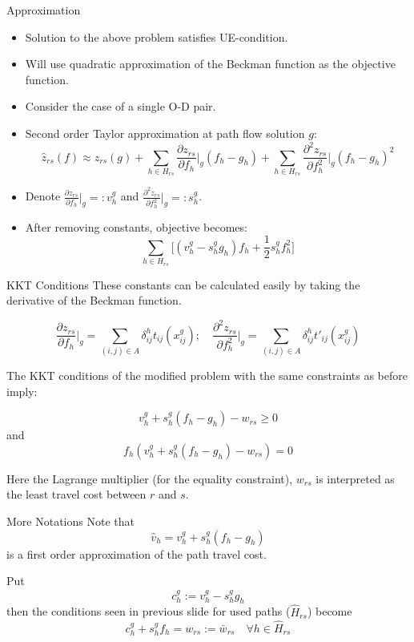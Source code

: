 \documentclass{beamer}
\begin{document}
\begin{frame}{Approximation}
\begin{itemize}
    \item Solution to the above problem satisfies
    UE-condition.
    
    \item Will use quadratic approximation of the
    Beckman function as the objective function.

    \item Consider the case of a single O-D pair.

    \item Second order Taylor approximation at path flow
    solution $g$:
    \[
        \hat{z}_{rs}(f) \approx z_{rs}(g) +
        \sum_{h\in H_{rs}}\frac{\partial z_{rs}}{\partial f_h}\bigg|_{g}
        (f_h-g_h)+
        \sum_{h\in H_{rs}} \frac{\partial ^2 z_{rs}}{\partial f_h^2}\bigg|_g(f_h-g_h)^2
    \]

    \item Denote $\frac{\partial z_{rs}}{\partial f_h}\big|_{g}=: v_h^g$ and
    $\frac{\partial ^2 z_{rs}}{\partial f_h^2}\big|_g =: s_h^g$.

    \item After removing constants, objective becomes:
    \[
        \sum_{h\in H_{rs}}\big[(v_h^g - s_h^g g_h)f_h + \frac{1}{2}
        s_h^g f_h^2\big]
    \]
\end{itemize}
\end{frame}

\begin{frame}{KKT Conditions}
These constants can be calculated easily by
taking the derivative of the Beckman function.

\[
\frac{\partial z_{rs}}{\partial f_h}\bigg|_{g}
= \sum_{(i,j)\in A}\delta_{ij}^h t_{ij}(x_{ij}^g);\quad
\frac{\partial ^2 z_{rs}}{\partial f_h^2}\bigg|_g
= \sum_{(i,j)\in A} \delta_{ij}^h t'_{ij}(x_{ij}^g)
\]

\pause

The KKT conditions of the modified problem with the
same constraints as before imply:

\[v_h^g + s_h^g(f_h-g_h) - w_{rs} \geq 0\]
and 
\[f_h(v_h^g + s_h^g(f_h-g_h) - w_{rs}) = 0\]

Here the Lagrange multiplier (for the equality constraint),
$w_{rs}$ is interpreted as the least travel cost between
$r$ and $s$.


\end{frame}

\begin{frame}{More Notations}
Note that
\[
\hat{v}_h = v_h^g + s_h^g(f_h-g_h)
\]
is a first order approximation of the path travel cost.

\pause

Put
\[
c_h^g := v_h^g - s_h^g g_h
\]
then the conditions seen in previous slide for used paths
($\hat{H}_{rs}$) become
\[
    c_h^g + s_h^g f_h = w_{rs} := \bar{w}_{rs} \quad \forall h\in\hat{H}_{rs}
\]
\end{frame}
\end{document}

